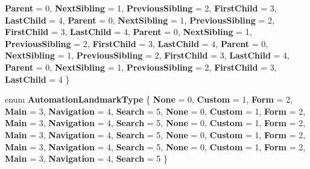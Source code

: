 \begin{DoxyCompactItemize}
{\bfseries Parent} = 0, 
{\bfseries Next\+Sibling} = 1, 
{\bfseries Previous\+Sibling} = 2, 
{\bfseries First\+Child} = 3, 
\newline
{\bfseries Last\+Child} = 4, 
{\bfseries Parent} = 0, 
{\bfseries Next\+Sibling} = 1, 
{\bfseries Previous\+Sibling} = 2, 
\newline
{\bfseries First\+Child} = 3, 
{\bfseries Last\+Child} = 4, 
{\bfseries Parent} = 0, 
{\bfseries Next\+Sibling} = 1, 
\newline
{\bfseries Previous\+Sibling} = 2, 
{\bfseries First\+Child} = 3, 
{\bfseries Last\+Child} = 4, 
{\bfseries Parent} = 0, 
\newline
{\bfseries Next\+Sibling} = 1, 
{\bfseries Previous\+Sibling} = 2, 
{\bfseries First\+Child} = 3, 
{\bfseries Last\+Child} = 4, 
\newline
{\bfseries Parent} = 0, 
{\bfseries Next\+Sibling} = 1, 
{\bfseries Previous\+Sibling} = 2, 
{\bfseries First\+Child} = 3, 
\newline
{\bfseries Last\+Child} = 4
 \}
\item 
\mbox{\label{namespace_windows_1_1_u_i_1_1_xaml_1_1_automation_1_1_peers_a7841d4ce398126516a6081408b8e9c0d}} 
enum {\bfseries Automation\+Landmark\+Type} \{ \newline
{\bfseries None} = 0, 
{\bfseries Custom} = 1, 
{\bfseries Form} = 2, 
{\bfseries Main} = 3, 
\newline
{\bfseries Navigation} = 4, 
{\bfseries Search} = 5, 
{\bfseries None} = 0, 
{\bfseries Custom} = 1, 
\newline
{\bfseries Form} = 2, 
{\bfseries Main} = 3, 
{\bfseries Navigation} = 4, 
{\bfseries Search} = 5, 
\newline
{\bfseries None} = 0, 
{\bfseries Custom} = 1, 
{\bfseries Form} = 2, 
{\bfseries Main} = 3, 
\newline
{\bfseries Navigation} = 4, 
{\bfseries Search} = 5, 
{\bfseries None} = 0, 
{\bfseries Custom} = 1, 
\newline
{\bfseries Form} = 2, 
{\bfseries Main} = 3, 
{\bfseries Navigation} = 4, 
{\bfseries Search} = 5, 
\newline
{\bfseries None} = 0, 
{\bfseries Custom} = 1, 
{\bfseries Form} = 2, 
{\bfseries Main} = 3, 
\newline
{\bfseries Navigation} = 4, 
{\bfseries Search} = 5
 \}
\item 
\mbox{\label{namespace_windows_1_1_u_i_1_1_xaml_1_1_automation_1_1_peers_aaf97ef41301cdde06f4cd3f8213a5478}} 

\end{DoxyCompactItemize}
